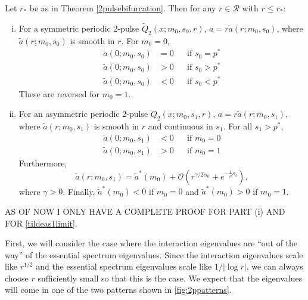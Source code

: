 \documentclass[thesis.tex]{subfiles}
\begin{document}
\begin{lemma}\label{lemma:chara}
Let $r_*$ be as in Theorem \ref{2pulsebifurcation}. Then for any $r \in \mathcal{R}$ with $r \leq r_*$:
\begin{enumerate}[(i)]
	\item For a symmetric periodic 2-pulse $\tilde{Q}_2(x; m_0, s_0, r)$, $a = r \tilde{a}(r; m_0, s_0)$, where $\tilde{a}(r; m_0, s_0)$ is smooth in $r$. For $m_0 = 0$,
	\begin{equation}
	\begin{aligned}
	\tilde{a}(0; m_0, s_0) &= 0 && \text{if }s_0 = p^* \\
	\tilde{a}(0; m_0, s_0) &> 0 && \text{if }s_0 > p^* \\
	\tilde{a}(0; m_0, s_0) &< 0 && \text{if }s_0 < p^*
	\end{aligned}
	\end{equation}
	These are reversed for $m_0 = 1$.
	\item For an asymmetric periodic 2-pulse $Q_2(x; m_0, s_1, r)$, $a = r \tilde{a}(r; m_0, s_1)$, where $\tilde{a}(r; m_0, s_1)$ is smooth in $r$ and continuous in $s_1$. For all $s_1 > p^*$,
	\begin{equation}
	\begin{aligned}
	\tilde{a}(0; m_0, s_1) &< 0 && \text{if }m_0 = 0 \\
	\tilde{a}(0; m_0, s_1) &> 0 && \text{if }m_0 = 1
	\end{aligned}
	\end{equation}
	Furthermore,
	\begin{equation}\label{tildeas1limit}
	\tilde{a}(r; m_0, s_1) = \tilde{a}^*(m_0) + \mathcal{O}\left(r^{\gamma/2\alpha_0} + e^{-\frac{1}{\rho}s_1} \right),
	\end{equation}
	where $\gamma > 0$. Finally, $\tilde{a}^*(m_0) < 0$ if $m_0 = 0$ and $\tilde{a}^*(m_0) > 0$ if $m_0 = 1$.
\end{enumerate}	
\end{lemma}
AS OF NOW I ONLY HAVE A COMPLETE PROOF FOR PART (i) AND FOR \cref{tildeas1limit}.

First, we will consider the case where the interaction eigenvalues are ``out of the way'' of the essential spectrum eigenvalues. Since the interaction eigenvalues scale like $r^{1/2}$ and the essential spectrum eigenvalues scale like $1/|\log r|$, we can always choose $r$ sufficiently small so that this is the case. We expect that the eigenvalues will come in one of the two patterns shown in \cref{fig:2ppatterns}.
\end{document}
